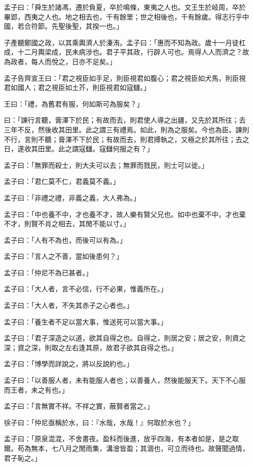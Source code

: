 
\begin{pinyinscope}
孟子曰：「舜生於諸馮，遷於負夏，卒於鳴條，東夷之人也。文王生於岐周，卒於畢郢，西夷之人也。地之相去也，千有餘里；世之相後也，千有餘歲。得志行乎中國，若合符節。先聖後聖，其揆一也。」

子產聽鄭國之政，以其乘輿濟人於溱洧。孟子曰：「惠而不知為政。歲十一月徒杠成，十二月輿梁成，民未病涉也。君子平其政，行辟人可也。焉得人人而濟之？故為政者，每人而悅之，日亦不足矣。」

孟子告齊宣王曰：「君之視臣如手足，則臣視君如腹心；君之視臣如犬馬，則臣視君如國人；君之視臣如土芥，則臣視君如寇讎。」

王曰：「禮，為舊君有服，何如斯可為服矣？」

曰：「諫行言聽，膏澤下於民；有故而去，則君使人導之出疆，又先於其所往；去三年不反，然後收其田里。此之謂三有禮焉。如此，則為之服矣。今也為臣。諫則不行，言則不聽；膏澤不下於民；有故而去，則君搏執之，又極之於其所往；去之日，遂收其田里。此之謂寇讎。寇讎何服之有？」

孟子曰：「無罪而殺士，則大夫可以去；無罪而戮民，則士可以徙。」

孟子曰：「君仁莫不仁，君義莫不義。」

孟子曰：「非禮之禮，非義之義，大人弗為。」

孟子曰：「中也養不中，才也養不才，故人樂有賢父兄也。如中也棄不中，才也棄不才，則賢不肖之相去，其閒不能以寸。」

孟子曰：「人有不為也，而後可以有為。」

孟子曰：「言人之不善，當如後患何？」

孟子曰：「仲尼不為已甚者。」

孟子曰：「大人者，言不必信，行不必果，惟義所在。」

孟子曰：「大人者，不失其赤子之心者也。」

孟子曰：「養生者不足以當大事，惟送死可以當大事。」

孟子曰：「君子深造之以道，欲其自得之也。自得之，則居之安；居之安，則資之深；資之深，則取之左右逢其原，故君子欲其自得之也。」

孟子曰：「博學而詳說之，將以反說約也。」

孟子曰：「以善服人者，未有能服人者也；以善養人，然後能服天下。天下不心服而王者，未之有也。」

孟子曰：「言無實不祥。不祥之實，蔽賢者當之。」

徐子曰：「仲尼亟稱於水，曰：『水哉，水哉！』何取於水也？」

孟子曰：「原泉混混，不舍晝夜。盈科而後進，放乎四海，有本者如是，是之取爾。苟為無本，七八月之閒雨集，溝澮皆盈；其涸也，可立而待也。故聲聞過情，君子恥之。」


\end{pinyinscope}
